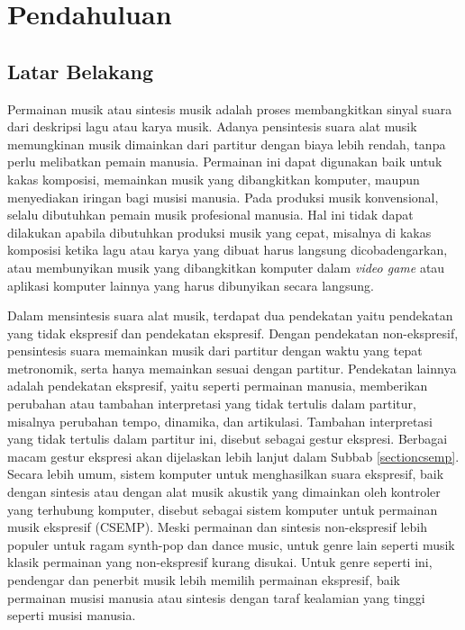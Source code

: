 \chapter{Pendahuluan}

\section{Latar Belakang}

Permainan musik atau sintesis musik adalah proses membangkitkan sinyal suara dari deskripsi lagu atau karya musik. Adanya pensintesis suara alat musik memungkinan musik dimainkan dari partitur dengan biaya lebih rendah, tanpa perlu melibatkan pemain manusia. Permainan ini dapat digunakan baik untuk kakas komposisi, memainkan musik yang dibangkitkan komputer, maupun menyediakan iringan bagi musisi manusia. Pada produksi musik konvensional, selalu dibutuhkan pemain musik profesional manusia. Hal ini tidak dapat dilakukan apabila dibutuhkan produksi musik yang cepat, misalnya di kakas komposisi ketika lagu atau karya yang dibuat harus langsung dicobadengarkan, atau membunyikan musik yang dibangkitkan komputer dalam \textit{video game} atau aplikasi komputer lainnya yang harus dibunyikan secara langsung.\parencite{Kirke:2009:SCS:1592451.1592454}

Dalam mensintesis suara alat musik, terdapat dua pendekatan yaitu pendekatan yang tidak ekspresif dan pendekatan ekspresif. Dengan pendekatan non-ekspresif, pensintesis suara memainkan musik dari partitur dengan waktu yang tepat metronomik, serta hanya memainkan sesuai dengan partitur. Pendekatan lainnya adalah pendekatan ekspresif, yaitu seperti permainan manusia, memberikan perubahan atau tambahan interpretasi yang tidak tertulis dalam partitur, misalnya perubahan tempo, dinamika, dan artikulasi. Tambahan interpretasi yang tidak tertulis dalam partitur ini, disebut sebagai gestur ekspresi. Berbagai macam gestur ekspresi akan dijelaskan lebih lanjut dalam Subbab \ref{sectioncsemp}. Secara lebih umum, sistem komputer untuk menghasilkan suara ekspresif, baik dengan sintesis atau dengan alat musik akustik yang dimainkan oleh kontroler yang terhubung komputer, disebut sebagai sistem komputer untuk permainan musik ekspresif (CSEMP). Meski permainan dan sintesis non-ekspresif lebih populer untuk ragam synth-pop dan dance music, untuk genre lain seperti musik klasik permainan yang non-ekspresif kurang disukai. Untuk genre seperti ini, pendengar dan penerbit musik lebih memilih permainan ekspresif, baik permainan musisi manusia atau sintesis dengan taraf kealamian yang tinggi seperti musisi manusia.\parencite{Kirke:2009:SCS:1592451.1592454}

